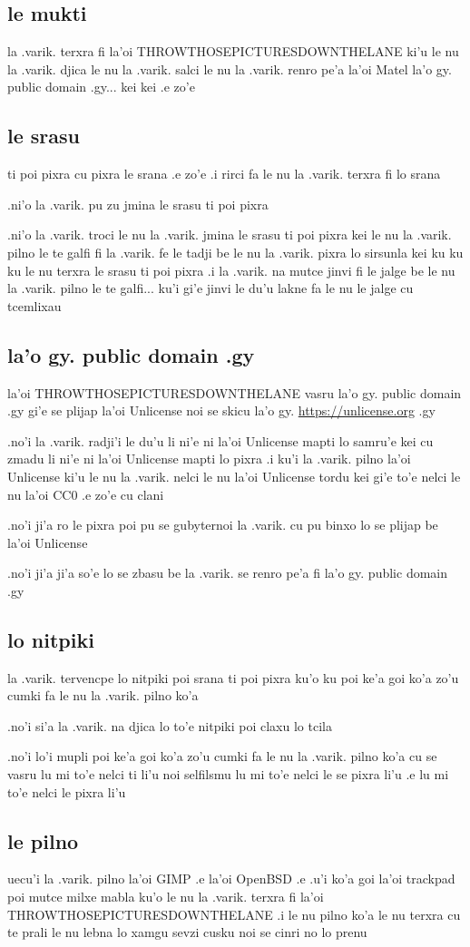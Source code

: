 \documentclass{report}
\begin{document}
\subsection{le mukti}
la .varik. terxra fi la'oi THROWTHOSEPICTURESDOWNTHELANE ki'u le nu la .varik. djica le nu la .varik. salci le nu la .varik. renro pe'a la'oi Matel la'o gy. public domain .gy... kei kei .e zo'e

\subsection{le srasu}
ti poi pixra cu pixra le srana .e zo'e  .i rirci fa le nu la .varik. terxra fi lo srana

.ni'o la .varik. pu zu jmina le srasu ti poi pixra

.ni'o la .varik. troci le nu la .varik. jmina le srasu ti poi pixra kei le nu la .varik. pilno le te galfi fi la .varik. fe le tadji be le nu la .varik. pixra lo sirsunla kei ku ku ku le nu terxra le srasu ti poi pixra  .i la .varik. na mutce jinvi fi le jalge be le nu la .varik. pilno le te galfi... ku'i gi'e jinvi le du'u lakne fa le nu le jalge cu tcemlixau

\subsection{la'o gy. public domain .gy}
la'oi THROWTHOSEPICTURESDOWNTHELANE vasru la'o gy. public domain .gy gi'e se plijap la'oi Unlicense noi se skicu la'o gy. \url{https://unlicense.org} .gy

.no'i la .varik. radji'i le du'u li ni'e ni la'oi Unlicense mapti lo samru'e kei cu zmadu li ni'e ni la'oi Unlicense mapti lo pixra  .i ku'i la .varik. pilno la'oi Unlicense ki'u le nu la .varik. nelci le nu la'oi Unlicense tordu kei gi'e to'e nelci le nu la'oi CC0 .e zo'e cu clani

.no'i ji'a ro le pixra poi pu se gubyternoi la .varik. cu pu binxo lo se plijap be la'oi Unlicense

.no'i ji'a ji'a so'e lo se zbasu be la .varik. se renro pe'a fi la'o gy. public domain .gy

\subsection{lo nitpiki}
la .varik. tervencpe lo nitpiki poi srana ti poi pixra ku'o ku poi ke'a goi ko'a zo'u cumki fa le nu la .varik. pilno ko'a

.no'i si'a la .varik. na djica lo to'e nitpiki poi claxu lo tcila

.no'i lo'i mupli poi ke'a goi ko'a zo'u cumki fa le nu la .varik. pilno ko'a cu se vasru lu mi to'e nelci ti li'u noi selfilsmu lu mi to'e nelci le se pixra li'u .e lu mi to'e nelci le pixra li'u
\subsection{le pilno}
uecu'i la .varik. pilno la'oi GIMP .e la'oi OpenBSD .e .u'i ko'a goi la'oi trackpad poi mutce milxe mabla ku'o le nu la .varik. terxra fi la'oi THROWTHOSEPICTURESDOWNTHELANE  .i le nu pilno ko'a le nu terxra cu te prali le nu lebna lo xamgu sevzi cusku noi se cinri no lo prenu
\end{document}
